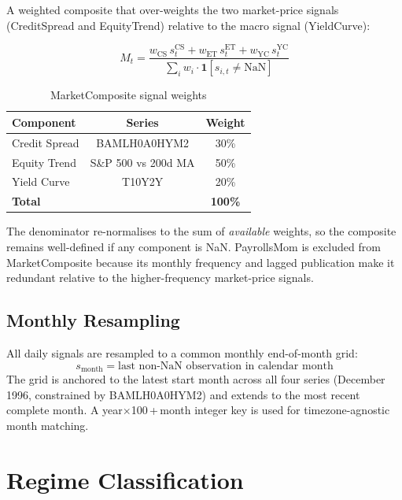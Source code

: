 \documentclass[11pt, a4paper]{article}
\begin{document}
A weighted composite that over-weights the two market-price signals
(CreditSpread and EquityTrend) relative to the macro signal (YieldCurve):

\[
  \boxed{M_t = \frac{w_{\text{CS}}\,s_t^{\text{CS}}
              + w_{\text{ET}}\,s_t^{\text{ET}}
              + w_{\text{YC}}\,s_t^{\text{YC}}}
             {\sum_{i} w_i \cdot \mathbf{1}[s_{i,t} \neq \text{NaN}]}}
\]

\begin{table}[H]
\centering
\caption{MarketComposite signal weights}
\begin{tabular}{lcc}
\toprule
\textbf{Component} & \textbf{Series} & \textbf{Weight} \\
\midrule
Credit Spread & BAMLH0A0HYM2 & 30\% \\
Equity Trend  & S\&P 500 vs 200d MA & 50\% \\
Yield Curve   & T10Y2Y & 20\% \\
\midrule
\textbf{Total} & & \textbf{100\%} \\
\bottomrule
\end{tabular}
\end{table}

The denominator re-normalises to the sum of \emph{available} weights,
so the composite remains well-defined if any component is NaN.
PayrollsMom is excluded from MarketComposite because its monthly frequency
and lagged publication make it redundant relative to the higher-frequency
market-price signals.

\subsection{Monthly Resampling}
\label{sec:resample}

All daily signals are resampled to a common monthly end-of-month grid:
\[
  s_{\text{month}} = \text{last non-NaN observation in calendar month}
\]
The grid is anchored to the latest start month across all four series
(December 1996, constrained by BAMLH0A0HYM2) and extends to the most
recent complete month. A year$\times$100\,+\,month integer key is used
for timezone-agnostic month matching.

\section{Regime Classification}
\label{sec:labels}
\end{document}
